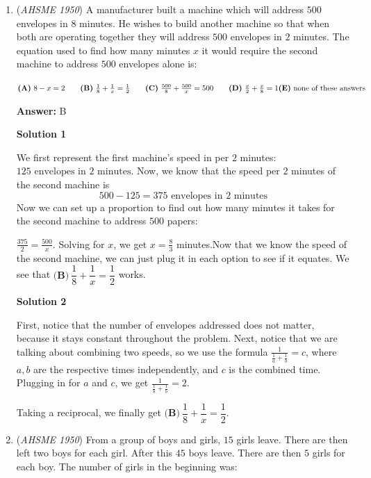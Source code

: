 \begin{enumerate}
 


	\item (\textit{AHSME 1950}) A manufacturer built a machine which will address $500$ envelopes in $8$ minutes. He wishes to build another machine so that when both are operating together they will address $500$ envelopes in $2$ minutes. The equation used to find how many minutes $x$ it would require the second machine to address $500$ envelopes alone is:


 $\textbf{(A)}\ 8-x=2\qquad\textbf{(B)}\ \frac{1}{8}+\frac{1}{x}=\frac{1}{2}\qquad\textbf{(C)}\ \frac{500}{8}+\frac{500}{x}=500\qquad\textbf{(D)}\ \frac{x}{2}+\frac{x}{8}=1\qquad\\ \textbf{(E)}\ \text{none of these answers}$

 \textbf{Answer: }B



\textbf{Solution 1}

We first represent the first machine's speed in per $2$ minutes: $125 \text{ envelopes in }2\text{ minutes}$. Now, we know that the speed per $2$ minutes of the second machine is 
 \[500-125=375 \text{ envelopes in }2\text{ minutes}\]Now we can set up a proportion to find out how many minutes it takes for the second machine to address $500$ papers:

 $\frac{375}{2}=\frac{500}{x}$. Solving for $x$, we get $x=\frac{8}{3}$ minutes.Now that we know the speed of the second machine, we can just plug it in each option to see if it equates. We see that $\boxed{\textbf{(B)}\ \dfrac{1}{8}+\dfrac{1}{x}=\dfrac{1}{2}}$ works.

 



\textbf{Solution 2}

First, notice that the number of envelopes addressed does not matter, because it stays constant throughout the problem. Next, notice that we are talking about combining two speeds, so we use the formula $\frac{1}{\frac{1}{a}+\frac{1}{b}}=c$, where $a,b$ are the respective times independently, and $c$ is the combined time. Plugging in for $a$ and $c$, we get $\frac{1}{\frac{1}{8}+\frac{1}{b}}=2$.

 Taking a reciprocal, we finally get $\boxed{\textbf{(B)}\ \dfrac{1}{8}+\dfrac{1}{x}=\dfrac{1}{2}}$.

 


	\item (\textit{AHSME 1950}) From a group of boys and girls, $15$ girls leave. There are then left two boys for each girl. After this $45$ boys leave. There are then $5$ girls for each boy. The number of girls in the beginning was:



\end{enumerate}
